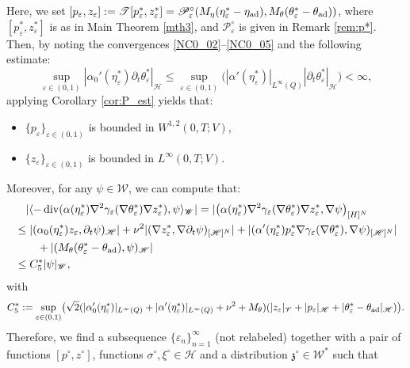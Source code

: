 \documentclass{sinst}
\numberwithin{equation}{section}
\theoremstyle{plain}
\theoremstyle{definition}
\def\sH{\mathscr{H}}
\def\sP{\mathscr{P}}
\def\sT{\mathscr{T}}
\def\sV{\mathscr{V}}
\def\sW{\mathscr{W}}
\def\ad{{\rm ad}}
\DeclareMathOperator{\diver}{div}
\begin{document}
Here, we set $[p_\varepsilon, z_\varepsilon] := \sT[p_\varepsilon^*, z_\varepsilon^*] = \sP_\varepsilon^\circ(M_\eta(\eta_\varepsilon^* - \eta_\ad), M_\theta(\theta_\varepsilon^* - \theta_\ad))$, where $[p_\varepsilon^*, z_\varepsilon^*]$ is as in Main Theorem \ref{mth3}, and $\sP_\varepsilon^\circ$ is given in Remark \ref{rem:p*}. Then, by noting the convergences \eqref{NC0_02}--\eqref{NC0_05} and the following estimate:
\begin{equation}
  \sup_{\varepsilon \in (0,1)} |\alpha_0'(\eta_\varepsilon^*) \partial_t \theta_\varepsilon^*|_\sH \leq \sup_{\varepsilon \in (0,1)} \bigl( |\alpha'(\eta_\varepsilon^*)|_{L^\infty(Q)} |\partial_t \theta_\varepsilon^*|_\sH \bigr) < \infty,
\end{equation}
applying Corollary \ref{cor:P_est} yields that:
\begin{itemize}
  \item $\{ p_\varepsilon \}_{\varepsilon \in (0,1)}$ is bounded in $W^{1,2}(0,T;V)$,
  \item $\{ z_\varepsilon \}_{\varepsilon \in (0,1)}$ is bounded in $L^\infty(0,T;V)$.
\end{itemize}
Moreover, for any $\psi \in \sW$, we can compute that:
\begin{align}
  &\quad |\langle -\diver (\alpha(\eta_\varepsilon^*) \nabla^2 \gamma_\varepsilon(\nabla \theta_\varepsilon^*) \nabla z_\varepsilon^*), \psi \rangle_\sW| = |\bigl( \alpha(\eta_\varepsilon^*) \nabla^2 \gamma_\varepsilon(\nabla \theta_\varepsilon^*) \nabla z_\varepsilon^*, \nabla \psi \bigr)_{[H]^N}
  \\
  &\leq |(\alpha_0(\eta_\varepsilon^*) z_\varepsilon, \partial_t \psi)_\sH| + \nu^2 |(\nabla z_\varepsilon^*, \nabla \partial_t \psi)_{[\sH]^N}| + |(\alpha'(\eta_\varepsilon^*) p_\varepsilon^* \nabla \gamma_\varepsilon(\nabla \theta_\varepsilon^*), \nabla \psi)_{[\sH]^N}|
  \\
  &\qquad + |(M_\theta(\theta_\varepsilon^* - \theta_\ad), \psi)_\sH|
  \\
  &\leq C_5^* |\psi|_\sW,
\end{align}
with
\begin{equation}
  C_5^* := \sup_{\varepsilon \in (0,1)} \bigl( \sqrt{2}(|\alpha_0'(\eta_\varepsilon^*)|_{L^\infty(Q)} + |\alpha'(\eta_\varepsilon^*)|_{L^\infty(Q)} + \nu^2 + M_\theta)(|z_\varepsilon|_\sV + |p_\varepsilon|_\sH + |\theta_\varepsilon^* - \theta_\ad|_\sH) \bigr).
\end{equation}
Therefore, we find a subsequence $\{ \varepsilon_n \}_{n=1}^\infty$ (not relabeled) together with a pair of functions $[p^\circ, z^\circ]$, functions $\sigma^\circ, \xi^\circ \in \sH$ and a distribution $\mathfrak{z}^\circ \in \sW^*$ such that
\end{document}
